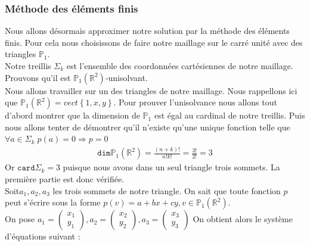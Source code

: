 \subsubsection{Méthode des éléments finis}
Nous allons désormais approximer notre solution par la méthode des éléments finis. Pour cela nous choisissons de faire notre maillage sur le carré unité avec des triangles $\mathbb{P}_{1}$.\\
Notre treillis $\Sigma_{k}$ est l'ensemble des coordonnées cartésiennes de notre maillage. Prouvons qu'il est $\mathbb{P}_{1}\left(\mathbb{R}^ {2}\right)$-unisolvant.\\
Nous allons travailler sur un des triangles de notre maillage. Nous rappellons ici que $\mathbb{P}_{1}\left(\mathbb{R}^ {2}\right)=vect\left\{1, x, y\right\}$. Pour prouver l'unisolvance nous allons tout d'abord montrer que la dimension de $\mathbb{P}_{1}$ est égal au cardinal de notre treillis. Puis nous allons tenter de démontrer qu'il n'existe qu'une unique fonction telle que $\forall a\in \Sigma_{k}\; p(a)=0\Rightarrow p=0$\\
\begin{align*}
\mathtt{dim}\mathbb{P}_{1}\left(\mathbb{R}^ {2}\right)=\frac{\left(n+k\right)!}{n!k!}=\frac{3!}{2!}=3
\end{align*}
Or $\mathtt{card}\Sigma_{k}=3$ puisque nous avons dans un seul triangle trois sommets. La première partie est donc vérifiée.\\
Soit$a_{1}, a_{2}, a_{3}$ les trois sommets de notre triangle. On sait que toute fonction $p$ peut s'écrire sous la forme $p(v)=a+bx+cy, v\in\mathbb{P}_{1}\left(\mathbb{R}^{2}\right)$.\\
On pose $a_{1}=\begin{pmatrix}
x_{1}\\
y_{1}
\end{pmatrix}
, a_{2}=\begin{pmatrix}
x_{2}\\
y_{2}
\end{pmatrix}
,a_{3}=\begin{pmatrix}
x_{3}\\
y_{3}
\end{pmatrix}$
On obtient alors le système d'équations suivant :\\
